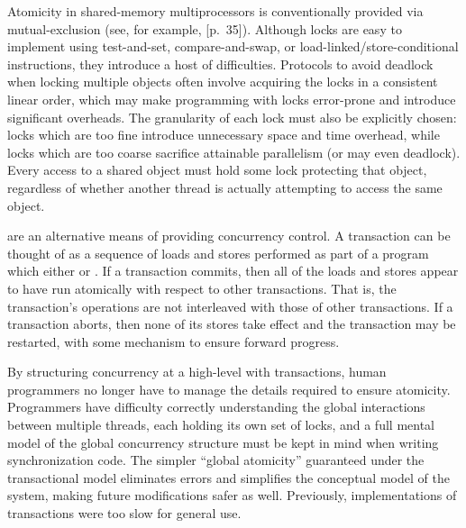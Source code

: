 Atomicity in shared-memory multiprocessors is 
conventionally provided
via mutual-exclusion  (see, for example,
\cite{Tanenbaum92}[p.~35]).  Although locks are easy to
implement using test-and-set, compare-and-swap, or
load-linked/{\bp}store-conditional instructions, they introduce a host of
difficulties.  Protocols to avoid deadlock when locking multiple
objects often involve acquiring the locks in a consistent linear
order, which may make programming with locks error-prone and introduce
significant overheads.  The granularity of each lock must also be
explicitly chosen: locks which are too fine introduce unnecessary
space and time overhead, while locks which are too coarse sacrifice
attainable parallelism (or may even deadlock).  Every access to a
shared object must hold some lock protecting that object, regardless
of whether another thread is actually attempting to access the same object.

 are
an alternative means of providing concurrency control.
A transaction can be thought of as a sequence of loads and stores
performed as part of a program which either
 or .  If a transaction
commits, then all of the loads and stores appear to have run
atomically with respect to other transactions.  That is, the
transaction's operations are not interleaved with those of other
transactions.  If a transaction aborts, then none of its stores take
effect and the transaction may be restarted, with some mechanism to
ensure forward progress.


By structuring concurrency at a high-level with transactions, human
programmers no longer have to manage the details required to ensure
atomicity.  Programmers have difficulty correctly understanding the global
interactions between multiple threads, each holding its own set of
locks, and a full mental model of the global concurrency structure
must be kept in mind when writing synchronization code.
The simpler ``global atomicity'' guaranteed under the
transactional model eliminates errors and simplifies the conceptual
model of the system, making future modifications safer as
well.  Previously, implementations of transactions were too slow for
general use.


